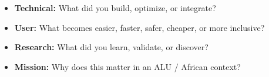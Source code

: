 
\begin{itemize}
  \item \textbf{Technical:} What did you build, optimize, or integrate?
  \item \textbf{User:} What becomes easier, faster, safer, cheaper, or more inclusive?
  \item \textbf{Research:} What did you learn, validate, or discover?
  \item \textbf{Mission:} Why does this matter in an ALU / African context?
\end{itemize}

